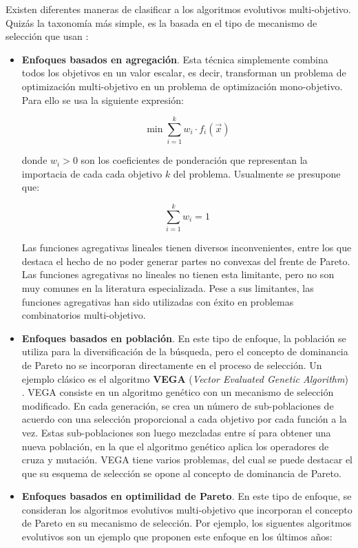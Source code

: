  Existen diferentes maneras de clasificar a los algoritmos evolutivos multi-objetivo. Quiz\'as la taxonom\'ia m\'as simple, 
  es la basada en el tipo de mecanismo de selecci\'on que usan \cite{EASMC}:
  
  \begin{itemize}
   \item \textbf{Enfoques basados en agregaci\'on}. Esta t\'ecnica simplemente combina todos los objetivos 
   en un valor escalar, es decir, transforman 
   un problema de optimizaci\'on multi-objetivo en un problema de optimizaci\'on mono-objetivo. Para ello se usa la siguiente 
   expresi\'on: 
   
	\[ \min {\sum^{k}_{i=1}{w_i\cdot f_i\left(\vec{x}\right)}}\]
   
   donde $w_i > 0$ son los coeficientes de ponderaci\'on que representan la importacia de cada cada objetivo $k$ del
   problema. Usualmente se presupone que:
   
   \[\sum^{k}_{i=1}{w_i}=1\]
   
   Las funciones agregativas lineales tienen diversos inconvenientes, entre los que destaca el hecho de no 
   poder generar partes no convexas del frente de Pareto. Las funciones agregativas no lineales no tienen esta limitante,
   pero no son muy comunes en la literatura especializada. Pese a sus limitantes, las funciones agregativas han sido utilizadas
   con \'exito en problemas combinatorios multi-objetivo.
   
   \item \textbf{Enfoques basados en poblaci\'on}. En este tipo de enfoque, la poblaci\'on se utiliza para la diversificaci\'on de la b\'usqueda, 
   pero el concepto de dominancia de Pareto no se incorporan directamente en el proceso de selecci\'on. Un ejemplo cl\'asico es el 
   algoritmo \textbf{VEGA} (\textit{Vector Evaluated Genetic Algorithm}) \cite{Schaffer84}. VEGA consiste en un algoritmo gen\'etico 
   con un mecanismo de selecci\'on modificado. En cada generaci\'on, se crea un n\'umero de sub-poblaciones de acuerdo con una 
   selecci\'on proporcional a cada objetivo por cada funci\'on a la vez. Estas sub-poblaciones son luego mezcladas entre s\'i para 
   obtener una nueva poblaci\'on, en la que el algoritmo gen\'etico aplica los operadores de cruza y mutaci\'on. VEGA tiene varios 
   problemas, del cual se puede destacar el que su esquema de selecci\'on se opone al concepto de dominancia de Pareto.
   
   \item \textbf{Enfoques basados en optimilidad de Pareto}. En este tipo de enfoque, se consideran los algoritmos evolutivos multi-objetivo que 
   incorporan el concepto de Pareto en su mecanismo de selecci\'on. Por ejemplo,  los siguentes algoritmos evolutivos son un ejemplo 
   que proponen este enfoque en los \'ultimos a\~nos:
   

\end{itemize}
